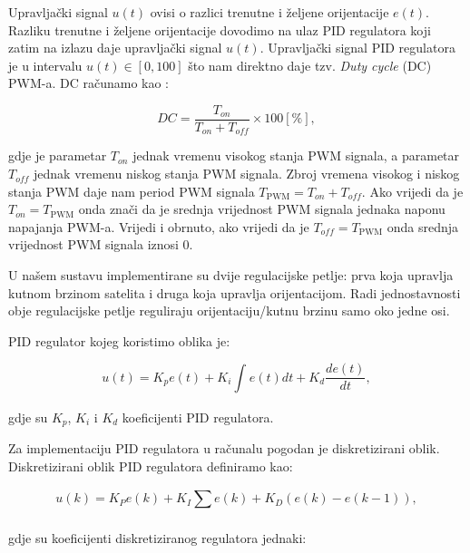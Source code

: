 \documentclass[times, utf8, diplomski, numeric]{templates/template}
\begin{document}
{{{{                Upravljački signal $u(t)$ ovisi o razlici trenutne i željene orijentacije $e(t)$. Razliku trenutne i željene orijentacije dovodimo na ulaz PID regulatora koji zatim na izlazu daje upravljački signal $u(t)$. Upravljački signal PID regulatora je u intervalu $u(t) \in \left[ 0, 100 \right]$ što nam direktno daje tzv. \emph{Duty cycle} (DC) PWM-a. DC računamo kao \cite{dc_pwm}:

                \begin{equation}
                    DC = \frac{T_{on}}{T_{on} + T_{off}} \times 100 \left[ \% \right],
                \end{equation}

                gdje je parametar $T_{on}$ jednak vremenu visokog stanja PWM signala, a parametar $T_{off}$ jednak vremenu niskog stanja PWM signala. Zbroj vremena visokog i niskog stanja PWM daje nam period PWM signala $T_{\text{PWM}} = T_{on} + T_{off}$. Ako vrijedi da je $T_{on}=T_{\text{PWM}}$ onda znači da je srednja vrijednost PWM signala jednaka naponu napajanja PWM-a. Vrijedi i obrnuto, ako vrijedi da je $T_{off}=T_{\text{PWM}}$ onda srednja vrijednost PWM signala iznosi 0.

                U našem sustavu implementirane su dvije regulacijske petlje: prva koja upravlja kutnom brzinom satelita i druga koja upravlja orijentacijom. Radi jednostavnosti obje regulacijske petlje reguliraju orijentaciju/kutnu brzinu samo oko jedne osi.

                PID regulator kojeg koristimo oblika je:

                \begin{equation}
                    u(t) = K_p e(t) + K_i \int_{}^{}{e(t)dt} + K_d \frac{de(t)}{dt},
                \end{equation}

                gdje su $K_p$, $K_i$ i $K_d$ koeficijenti PID regulatora.

                Za implementaciju PID regulatora u računalu pogodan je diskretizirani oblik. Diskretizirani oblik PID regulatora \cite{diskr_pid} definiramo kao:

                \begin{equation}
                    u(k) = K_P e(k) + K_I \sum_{}^{}{e(k)} + K_D (e(k) - e(k-1)),
                \end{equation}

                gdje su koeficijenti diskretiziranog regulatora jednaki:

}}}}
\end{document}
